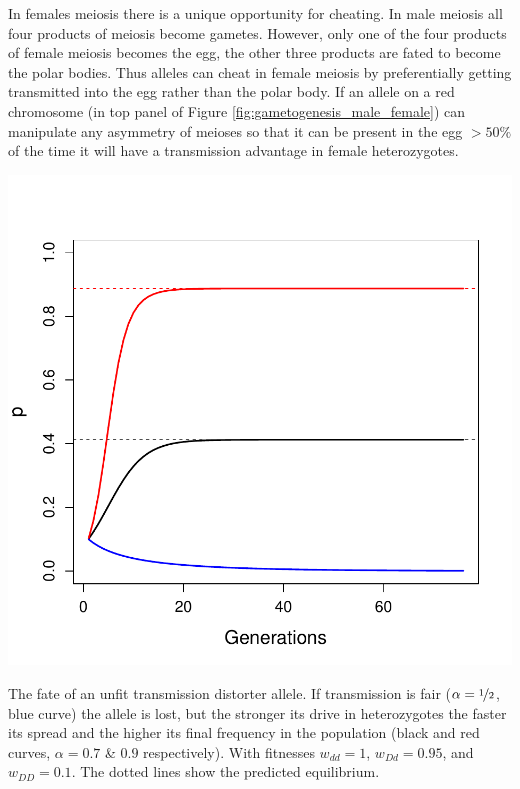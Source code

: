 {In females meiosis there is a unique opportunity for cheating. In male
meiosis all four products of meiosis become gametes. 
However, only one of the four products of female meiosis becomes the egg, the other three products
are fated to become the polar bodies. Thus alleles can cheat in female meiosis by preferentially getting
transmitted into the egg rather than the polar body. If an allele on
a red chromosome (in top panel of Figure \ref{fig:gametogenesis_male_female}) can manipulate any asymmetry of meioses so that it can be
present in the egg $>50\%$ of the time it will have a transmission
advantage in female heterozygotes. 

 \begin{marginfigure}
\begin{center}
\includegraphics[width= \textwidth]{figures/autosomal_driver.pdf}
\end{center}
\caption{
The fate of an unfit transmission distorter allele. If transmission is
fair ($\alpha =\nicefrac
{1}{2}$, blue curve) the allele is lost, but the stronger its drive in
heterozygotes the faster its spread and the higher its final frequency
in the population (black and red curves, $\alpha =0.7$ \& $0.9$
respectively).  With fitnesses $w_{dd}=1$,
$w_{Dd}=0.95$, and $ w_{DD}=0.1$. The dotted lines show the predicted
equilibrium. 
} \label{fig:autosomal_driver}
\end{marginfigure} 


}
